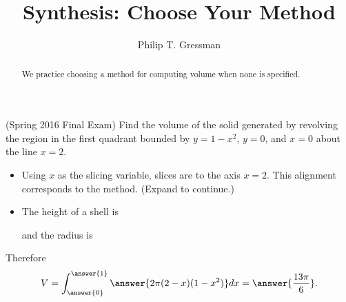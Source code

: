 \documentclass{ximera}
\title{Synthesis: Choose Your Method}
\author{Philip T. Gressman}
\begin{document}
\begin{abstract}
We practice choosing a method for computing volume when none is specified.
\end{abstract}
\maketitle


\begin{example}
(Spring 2016 Final Exam) Find the volume of the solid generated by revolving the region in the first quadrant bounded by $y = 1-x^2$, $y = 0$, and $x = 0$ about the line $x=2$.
\begin{itemize}
\item Using $x$ as the slicing variable, slices are  to the axis $x=2$. This alignment corresponds to the  method.
(Expand to continue.)
\end{itemize}
\begin{expandable}
\begin{itemize}
\item The height of a shell is 
\begin{multipleChoice}
\end{multipleChoice}
and the radius is
\begin{multipleChoice}
\end{multipleChoice}
\end{itemize}
Therefore
\[ V = \int_{\answer{0}}^{\answer{1}} \answer{2 \pi (2-x)(1-x^2)} dx = \answer{\frac{13 \pi}{6}}. \]
\end{expandable}
\end{example}
\end{document}
